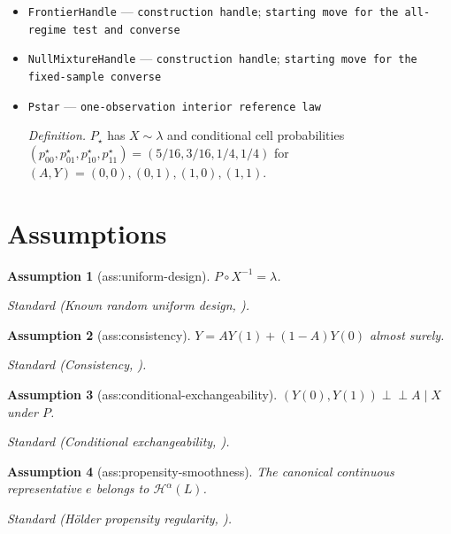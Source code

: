 \documentclass{article}
\newtheorem{assumption}{Assumption}
\begin{document}
\begin{itemize}
  \item \texttt{FrontierHandle} --- \texttt{construction handle}; \texttt{starting move for the all-\allowbreak{}regime test and converse}
  \item \texttt{NullMixtureHandle} --- \texttt{construction handle}; \texttt{starting move for the fixed-\allowbreak{}sample converse}
  \item \texttt{Pstar} --- \texttt{one-\allowbreak{}observation interior reference law}
  \par\smallskip\noindent\emph{Definition.} \(P_\star\) has \(X\sim\lambda\) and conditional cell probabilities \((p^\star_{00},p^\star_{01},p^\star_{10},p^\star_{11})=(5/16,3/16,1/4,1/4)\) for \((A,Y)=(0,0),(0,1),(1,0),(1,1)\).
\end{itemize}

\section{Assumptions}

\begin{assumption}[ass:uniform-design]\label{ass:uniform-design}
\(P\circ X^{-1}=\lambda\).
\par\smallskip\noindent\emph{Standard} (Known random uniform design, \cite{KennedyBalakrishnanRobinsWasserman2024}).
\end{assumption}

\begin{assumption}[ass:consistency]\label{ass:consistency}
\(Y=A Y(1)+(1-A)Y(0)\) almost surely.
\par\smallskip\noindent\emph{Standard} (Consistency, \cite{HernanRobins2020}).
\end{assumption}

\begin{assumption}[ass:conditional-exchangeability]\label{ass:conditional-exchangeability}
\((Y(0),Y(1))\mathrel{\perp\!\!\!\perp}A\mid X\) under \(P\).
\par\smallskip\noindent\emph{Standard} (Conditional exchangeability, \cite{HernanRobins2020}).
\end{assumption}

\begin{assumption}[ass:propensity-smoothness]\label{ass:propensity-smoothness}
The canonical continuous representative \(e\) belongs to \(\mathcal H^{\alpha}(L)\).
\par\smallskip\noindent\emph{Standard} (Hölder propensity regularity, \cite{KennedyBalakrishnanRobinsWasserman2024}).
\end{assumption}
\end{document}
